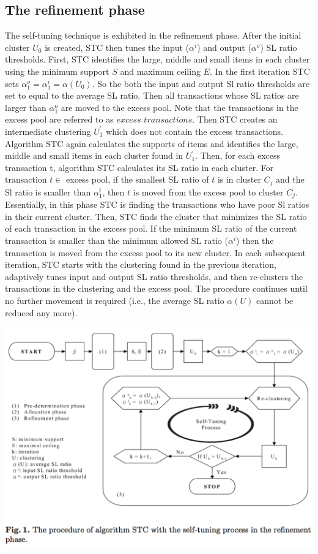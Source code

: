 \documentclass[11pt,reqno]{amsart}
\theoremstyle{definition}
\numberwithin{equation}{subsection}
\begin{document}
\subsection{The refinement phase}The self-tuning technique is exhibited in the refinement phase. After the initial cluster $U_0$ is created, STC then tunes the input ($\alpha ^i$) and output ($\alpha ^o$) SL ratio thresholds. First, STC identifies the large, middle and small items in each cluster using the minimum support $S$ and maximum ceiling $E$. In the first iteration STC sets $\alpha_1 ^o = \alpha_1 ^i = \alpha(U_0).$ So the both the input and output Sl ratio thresholds are set to equal to the average SL ratio. Then all transactions whose SL ratios are larger than $\alpha_1 ^o$ are moved to the excess pool. Note that the transactions in the excess pool are referred to as $excess$ $transactions$. Then STC creates an intermediate clustering $U_1^ \prime$ which does not contain the excess transactions. Algorithm STC again calculates the supports of items and identifies the large, middle and small items in each cluster found in $U_1^ \prime$. Then, for each excess transaction t, algorithm STC calculates its SL ratio in each cluster.  For transaction $t \in$ excess pool, if the smallest SL ratio of $t$ is in cluster $C_j$ and the Sl ratio is smaller than $\alpha_1 ^i$, then $t$ is moved from the excess pool to cluster $C_j$. Essentially, in this phase STC is finding the transactions who have poor Sl ratios in their current cluster. Then, STC finds the cluster that minimizes the SL ratio of each transaction in the excess pool.  If the minimum SL ratio of the current transaction is smaller than the minimum allowed SL ratio ($\alpha^i$) then the transaction is moved from the excess pool to its new cluster. In each subsequent iteration, STC starts with the clustering found in the previous iteration, adaptively tunes input and output SL ratio thresholds, and then re-clusters the transactions in the clustering and the excess pool. The procedure continues until no further movement is required (i.e., the average SL ratio $\alpha(U)$ cannot be reduced any more).


\includegraphics[scale=.70]{pic4}
\end{document}
